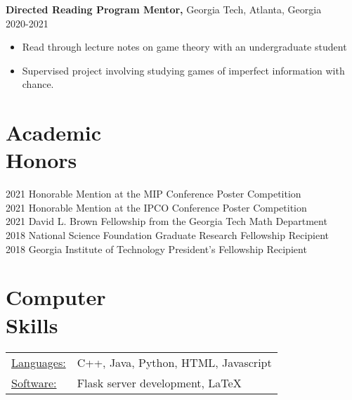 \documentclass[margin]{res}
\begin{document}
\begin{resume}
       {\bf Directed Reading Program Mentor,} Georgia Tech, Atlanta, Georgia     \\         2020-2021 
        \begin{itemize} \itemsep -2pt
            \item Read through lecture notes on game theory with an undergraduate student
          \item Supervised project involving studying games of imperfect information with chance.
		 \end{itemize}


\section{Academic \\ Honors} 
2021 Honorable Mention at the MIP Conference Poster Competition\\
2021 Honorable Mention at the IPCO Conference Poster Competition\\
2021 David L. Brown Fellowship from the Georgia Tech Math Department\\
2018 National Science Foundation Graduate Research Fellowship Recipient\\
2018 Georgia Institute of Technology President's Fellowship Recipient

\section{Computer \\ Skills}
   \begin{tabular}{l p{3in}}
    \underline{Languages:} & C++, Java, Python, HTML, Javascript \\

     \underline{Software:} & Flask server development, \LaTeX
 \end{tabular}

\end{resume} 
\end{document}
